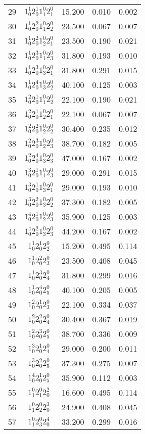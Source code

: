 \documentclass{revtex4}
\begin{document}
\begin{table}
\begin{tabular}{rcrrr}
29&$1_0^1 2_0^1 1_1^0 2_1^0$& 15.200& 0.010& 0.002\\
30&$1_0^1 2_0^2 1_1^0 2_2^0$& 23.500& 0.067& 0.007\\
31&$1_0^1 2_0^2 1_2^0 2_1^0$& 23.500& 0.190& 0.021\\
32&$1_0^1 2_0^3 1_1^0 2_3^0$& 31.800& 0.193& 0.010\\
33&$1_0^1 2_0^3 1_3^0 2_1^0$& 31.800& 0.291& 0.015\\
34&$1_0^1 2_0^4 1_3^0 2_2^0$& 40.100& 0.125& 0.003\\
35&$1_0^2 2_0^1 1_1^0 2_2^0$& 22.100& 0.190& 0.021\\
36&$1_0^2 2_0^1 1_2^0 2_1^0$& 22.100& 0.067& 0.007\\
37&$1_0^2 2_0^2 1_2^0 2_2^0$& 30.400& 0.235& 0.012\\
38&$1_0^2 2_0^3 1_2^0 2_3^0$& 38.700& 0.182& 0.005\\
39&$1_0^2 2_0^4 1_3^0 2_3^0$& 47.000& 0.167& 0.002\\
40&$1_0^3 2_0^1 1_1^0 2_3^0$& 29.000& 0.291& 0.015\\
41&$1_0^3 2_0^1 1_3^0 2_1^0$& 29.000& 0.193& 0.010\\
42&$1_0^3 2_0^2 1_3^0 2_2^0$& 37.300& 0.182& 0.005\\
43&$1_0^4 2_0^1 1_2^0 2_3^0$& 35.900& 0.125& 0.003\\
44&$1_0^4 2_0^2 1_3^0 2_3^0$& 44.200& 0.167& 0.002\\
45&$1_0^1 2_0^1 2_2^0$& 15.200& 0.495& 0.114\\
46&$1_0^1 2_0^2 2_3^0$& 23.500& 0.408& 0.045\\
47&$1_0^1 2_0^3 2_4^0$& 31.800& 0.299& 0.016\\
48&$1_0^1 2_0^4 2_5^0$& 40.100& 0.205& 0.005\\
49&$1_0^2 2_0^1 2_3^0$& 22.100& 0.334& 0.037\\
50&$1_0^2 2_0^2 2_4^0$& 30.400& 0.367& 0.019\\
51&$1_0^2 2_0^3 2_5^0$& 38.700& 0.336& 0.009\\
52&$1_0^3 2_0^1 2_4^0$& 29.000& 0.200& 0.011\\
53&$1_0^3 2_0^2 2_5^0$& 37.300& 0.275& 0.007\\
54&$1_0^4 2_0^1 2_5^0$& 35.900& 0.112& 0.003\\
55&$1_1^0 2_1^0 2_0^2$& 16.600& 0.495& 0.114\\
56&$1_1^0 2_2^0 2_0^3$& 24.900& 0.408& 0.045\\
57&$1_1^0 2_3^0 2_0^4$& 33.200& 0.299& 0.016\\

\end{tabular}
\end{table}
\end{document}

